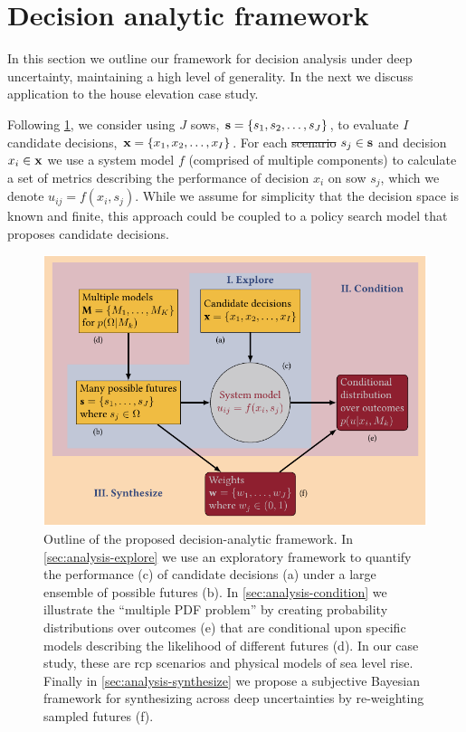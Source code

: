 \documentclass{agujournal2019}
\providecommand{\DIFadd}[1]{{\protect\color{blue}\uwave{#1}}} %
\providecommand{\DIFdel}[1]{{\protect\color{red}\sout{#1}}}                      %
\providecommand{\DIFaddbegin}{} %
\providecommand{\DIFaddend}{} %
\providecommand{\DIFdelbegin}{} %
\providecommand{\DIFdelend}{} %
\newcommand{\DIFscaledelfig}{0.5}
\newlength{\DIFdelgraphicswidth} %
\newlength{\DIFdelgraphicsheight} %
\newcommand{\DIFaddincludegraphics}[2][]{{\color{blue}\fbox{\DIFOincludegraphics[#1]{#2}}}} %
\newcommand{\DIFdelincludegraphics}[2][]{%
\sbox{\DIFdelgraphicsbox}{\DIFOincludegraphics[#1]{#2}}%
\settoboxwidth{\DIFdelgraphicswidth}{\DIFdelgraphicsbox} %
\settoboxtotalheight{\DIFdelgraphicsheight}{\DIFdelgraphicsbox} %
\scalebox{\DIFscaledelfig}{%
\parbox[b]{\DIFdelgraphicswidth}{\usebox{\DIFdelgraphicsbox}\\[-\baselineskip] \rule{\DIFdelgraphicswidth}{0em}}\llap{\resizebox{\DIFdelgraphicswidth}{\DIFdelgraphicsheight}{%
\setlength{\unitlength}{\DIFdelgraphicswidth}%
\begin{picture}(1,1)%
\thicklines\linethickness{2pt} %
{\color[rgb]{1,0,0}\put(0,0){\framebox(1,1){}}}%
{\color[rgb]{1,0,0}\put(0,0){\line( 1,1){1}}}%
{\color[rgb]{1,0,0}\put(0,1){\line(1,-1){1}}}%
\end{picture}%
}\hspace*{3pt}}} %
} %
\DeclareRobustCommand{\DIFaddbegin}{\DIFOaddbegin \let\includegraphics\DIFaddincludegraphics} %
\DeclareRobustCommand{\DIFaddend}{\DIFOaddend \let\includegraphics\DIFOincludegraphics} %
\DeclareRobustCommand{\DIFdelbegin}{\DIFOdelbegin \let\includegraphics\DIFdelincludegraphics} %
\DeclareRobustCommand{\DIFdelend}{\DIFOaddend \let\includegraphics\DIFOincludegraphics} %
\begin{document}
\section{Decision analytic framework}\label{sec:analysis}

In this section we outline our framework for decision analysis under deep uncertainty, maintaining a high level of generality.
In the next we discuss application to the house elevation case study.

Following \cref{fig:flowchart}, we consider using $J$ \glspl{sow}, $\vb{s} = \qty{s_1, s_2, \ldots, s_J}$, to evaluate $I$ candidate decisions, $\vb{x} = \qty{x_1, x_2, \ldots, x_I}$.
For each \DIFdelbegin \DIFdel{scenario }\DIFdelend \DIFaddbegin \DIFadd{\mbox{%
\gls{sow} }\hskip0pt%
}\DIFaddend $s_j \in \vb{s}$ and decision $x_i \in \vb{x}$ we use a system model $f$ (comprised of multiple components) to calculate a set of metrics describing the performance of decision $x_i$ on \gls{sow} $s_j$, which we denote $u_{ij} = f(x_i, s_j)$.
While we assume for simplicity that the decision space is known and finite, this approach could be coupled to a policy search model that proposes candidate decisions.

\begin{figure}
  \centering
  \includegraphics[width=\textwidth]{bayes-rdm.pdf}
  \caption{
    Outline of the proposed decision-analytic framework.
    In \cref{sec:analysis-explore} we use an exploratory framework to quantify the performance (c) of candidate decisions (a) under a large ensemble of possible futures (b).
    In \cref{sec:analysis-condition} we illustrate the ``multiple PDF problem'' by creating probability distributions over outcomes (e) that are conditional upon specific models describing the likelihood of different futures (d).
    In our case study, these are \gls{rcp} scenarios and physical models of sea level rise.
    Finally in \cref{sec:analysis-synthesize} we propose a subjective Bayesian framework for synthesizing across deep uncertainties by re-weighting sampled futures (f).
  }\label{fig:flowchart}
\end{figure}
\end{document}
